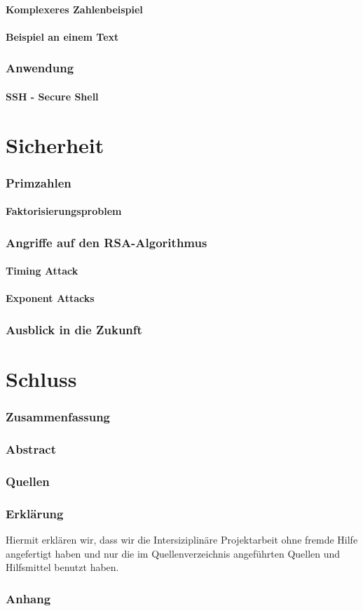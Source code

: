 \documentclass[12pt,a4paper,german]{article}
\begin{document}
\subsection{Komplexeres Zahlenbeispiel}
\subsection{Beispiel an einem Text}
\section{Anwendung}
\subsection{SSH - Secure Shell}

\newpage
\part{Sicherheit}
\section{Primzahlen}
\subsection{Faktorisierungsproblem}
\section{Angriffe auf den RSA-Algorithmus}
\subsection{Timing Attack}
\subsection{Exponent Attacks}
\section{Ausblick in die Zukunft}

\newpage
\part{Schluss}
\section{Zusammenfassung}
\section{Abstract}
\section{Quellen}
\section{Erklärung}
Hiermit erklären wir, dass wir die Intersiziplinäre Projektarbeit ohne fremde Hilfe angefertigt haben und nur die im Quellenverzeichnis angeführten Quellen und Hilfsmittel benutzt haben.
\section{Anhang}
\end{document}
